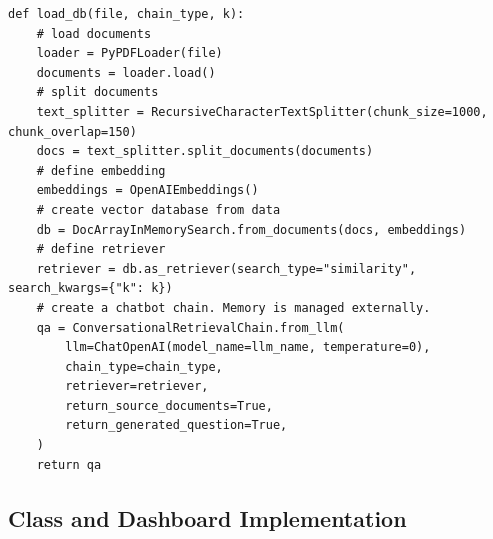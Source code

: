 \documentclass{article}
\begin{document}
\begin{lstlisting}[style=pythonstyle, caption={Python Code for Loading Database and Creating a Conversational Retrieval Chain}]
def load_db(file, chain_type, k):
    # load documents
    loader = PyPDFLoader(file)
    documents = loader.load()
    # split documents
    text_splitter = RecursiveCharacterTextSplitter(chunk_size=1000, chunk_overlap=150)
    docs = text_splitter.split_documents(documents)
    # define embedding
    embeddings = OpenAIEmbeddings()
    # create vector database from data
    db = DocArrayInMemorySearch.from_documents(docs, embeddings)
    # define retriever
    retriever = db.as_retriever(search_type="similarity", search_kwargs={"k": k})
    # create a chatbot chain. Memory is managed externally.
    qa = ConversationalRetrievalChain.from_llm(
        llm=ChatOpenAI(model_name=llm_name, temperature=0),
        chain_type=chain_type,
        retriever=retriever,
        return_source_documents=True,
        return_generated_question=True,
    )
    return qa
\end{lstlisting}

\pagebreak

\subsection{Class and Dashboard Implementation}
\end{document}
